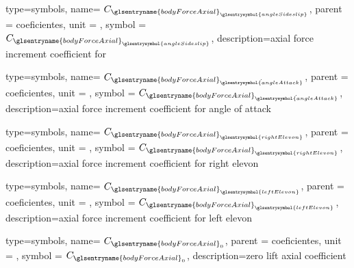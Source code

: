 {type=symbols,
    name= \ensuremath{C_{{\glsentryname{bodyForceAxial}}_{\glsentrysymbol{angleSideslip}}}},
    parent = {coeficientes},
    unit = \unexpanded{},
    symbol = \ensuremath{C_{{\glsentryname{bodyForceAxial}}_{\glsentrysymbol{angleSideslip}}}},
    description={axial force increment coefficient for }
}


{type=symbols,
    name= \ensuremath{C_{{\glsentryname{bodyForceAxial}}_{\dot{\glsentrysymbol{angleAttack}}}}},
    parent = {coeficientes},
    unit = \unexpanded{},
    symbol = \ensuremath{C_{{\glsentryname{bodyForceAxial}}_{\dot{\glsentrysymbol{angleAttack}}}}},
    description={axial force increment coefficient for angle of attack}
}

{type=symbols,
    name= \ensuremath{C_{{\glsentryname{bodyForceAxial}}_{\glsentrysymbol{rightElevon}}}},
    parent = {coeficientes},
    unit = \unexpanded{},
    symbol = \ensuremath{C_{{\glsentryname{bodyForceAxial}}_{\glsentrysymbol{rightElevon}}}},
    description={axial force increment coefficient for right elevon}
}


{type=symbols,
    name= \ensuremath{C_{{\glsentryname{bodyForceAxial}}_{\glsentrysymbol{leftElevon}}}},
    parent = {coeficientes},
    unit = \unexpanded{},
    symbol = \ensuremath{C_{{\glsentryname{bodyForceAxial}}_{\glsentrysymbol{leftElevon}}}},
    description={axial force increment coefficient for left elevon}
}

{type=symbols,
    name= \ensuremath{C_{{\glsentryname{bodyForceAxial}}_{0}}},
    parent = {coeficientes},
    unit = \unexpanded{},
    symbol = \ensuremath{C_{{\glsentryname{bodyForceAxial}}_{0}}},
    description={zero lift axial coefficient}
}